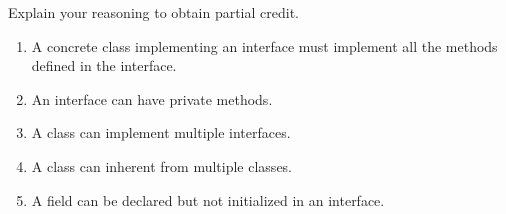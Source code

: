 \Instructions
   Explain your reasoning to obtain partial credit.
\begin{enumerate}
\vspace{2em}

\item {} \tf A concrete class implementing an interface must implement all the methods defined in the interface.


\vspace{4em}
\item {} \tf An interface can have private methods.


\vspace{4em}

\item {} \tf A class can implement multiple interfaces.


\vspace{4em}

\item {} \tf A class can inherent from multiple classes.


\vspace{4em}

\item {} \tf A field can be declared but not initialized in an interface.



\vspace{2em}

\end{enumerate}   
